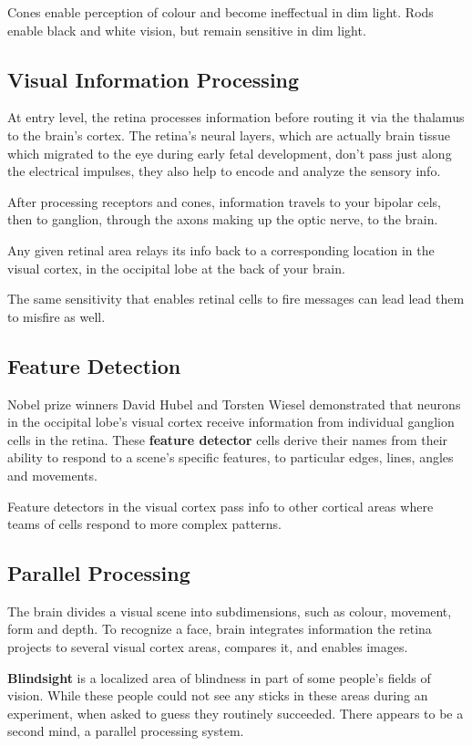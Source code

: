\documentclass[12pt]{article}
\begin{document}
Cones enable perception of colour and become ineffectual in dim light. Rods enable black and white vision, but remain sensitive in dim light.

\subsection{Visual Information Processing}
At entry level, the retina processes information before routing it via the thalamus to the brain's cortex. The retina's neural layers, which are actually brain tissue which migrated to the eye during early fetal development, don't pass just along the electrical impulses, they also help to encode and analyze the sensory info. 

After processing receptors and cones, information travels to your bipolar cels, then to ganglion, through the axons making up the optic nerve, to the brain.

Any given retinal area relays its info back to a corresponding location in the visual cortex, in the occipital lobe at the back of your brain.

The same sensitivity that enables retinal cells to fire messages can lead lead them to misfire as well.

\subsection*{Feature Detection}
Nobel prize winners David Hubel and Torsten Wiesel demonstrated that neurons in the occipital lobe's visual cortex receive information from individual ganglion cells in the retina. These \textbf{feature detector} cells derive their names from their ability to respond to a scene's specific features, to particular edges, lines, angles and movements.

Feature detectors in the visual cortex pass info to other cortical areas where teams of cells respond to more complex patterns. 

\subsection*{Parallel Processing}
The brain divides a visual scene into subdimensions, such as colour, movement, form and depth. To recognize a face, brain integrates information the retina projects to several visual cortex areas, compares it, and enables images. 

\textbf{Blindsight} is a localized area of blindness in part of some people's fields of vision. While these people could not see any sticks in these areas during an experiment, when asked to guess they routinely succeeded. There appears to be a second mind, a parallel processing system.
\end{document}

